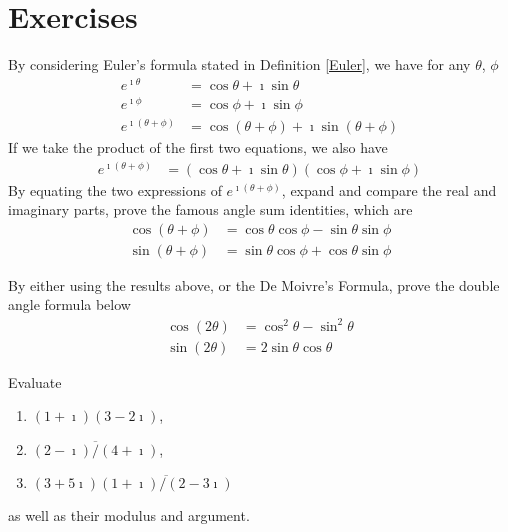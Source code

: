 \section{Exercises}

\begin{Exercise}
By considering Euler's formula stated in Definition \ref{Euler}, we have for any $\theta$, $\phi$
\begin{align*}
e^{\imath \theta} &= \cos \theta + \imath \sin \theta \\
e^{\imath \phi} &= \cos \phi + \imath \sin \phi \\
e^{\imath (\theta+\phi)} &= \cos (\theta+\phi) + \imath \sin (\theta+\phi)
\end{align*}
If we take the product of the first two equations, we also have
\begin{align*}
e^{\imath (\theta+\phi)} &= (\cos \theta + \imath \sin \theta)(\cos \phi + \imath \sin \phi)
\end{align*}
By equating the two expressions of $e^{\imath (\theta+\phi)}$, expand and compare the real and imaginary parts, prove the famous angle sum identities, which are
\begin{align*}
\cos(\theta+\phi) &= \cos\theta \cos\phi - \sin\theta \sin\phi \\
\sin(\theta+\phi) &= \sin\theta \cos\phi + \cos\theta \sin\phi 
\end{align*}
\end{Exercise}

\begin{Exercise}
By either using the results above, or the De Moivre's Formula, prove the double angle formula below
\begin{align*}
\cos(2\theta) &= \cos^2\theta - \sin^2\theta \\
\sin(2\theta) &= 2\sin\theta \cos\theta  
\end{align*}
\end{Exercise}

\begin{Exercise}
Evaluate
\begin{enumerate}[label=(\alph*)]
\item $(1+\imath)(3-2\imath)$,
\item $\overline{(2-\imath)/(4+\imath)}$,
\item $(3+5\imath)\overline{(1+\imath)/(2-3\imath)}$
\end{enumerate}
as well as their modulus and argument.
\end{Exercise}

